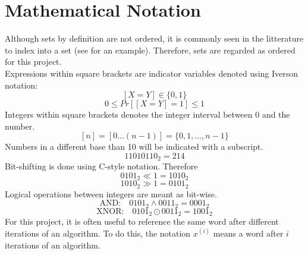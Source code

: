 \section{Mathematical Notation}
Although sets by definition are not ordered, it is commonly seen in the litterature to index into a set (see \cite{fast-similarity-search} for an example). Therefore, sets are regarded as ordered for this project.\\
Expressions within square brackets are indicator variables denoted using Iverson notation:
$$[X = Y] \in \{0, 1\}$$
$$0 \leq Pr[[X = Y] = 1] \leq 1$$
Integers within square brackets denotes the integer interval between 0 and the number.
$$[n] = [0 \dots (n-1)] = \{ 0, 1, \dots, n-1\}$$
Numbers in a different base than 10 will be indicated with a subscript.
$$11010110_2 = 214$$
Bit-shifting is done using C-style notation. Therefore 
$$0101_2 \ll 1 = 1010_2$$
$$1010_2 \gg 1 = 0101_2$$
Logical operations between integers are meant as bit-wise.
$$\textrm{AND:}\quad 0101_2 \land 0011_2 = 0001_2$$
$$\textrm{XNOR:}\quad 0101_2 \odot 0011_2 = 1001_2$$
For this project, it is often useful to reference the same word after different iterations of an algorithm. To do this, the notation $x^{(i)}$ means a word after $i$ iterations of an algorithm.

